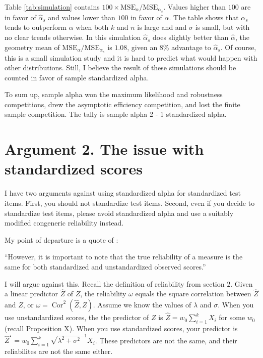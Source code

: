 \documentclass{article}
\theoremstyle{plain}
\theoremstyle{plain}
\theoremstyle{definition}
\theoremstyle{remark}
\theoremstyle{definition}
\theoremstyle{plain}
\theoremstyle{plain}
\theoremstyle{definition}
\DeclareMathOperator{\Cor}{Cor}
\begin{document}
Table \ref{tab:simulation} contains $100 \times \textrm{MSE}_\alpha/\textrm{MSE}_{\alpha_s}$. Values higher than $100$ are in favor of $\widehat{\alpha}_s$ and values lower than $100$ in favor of $\widehat{\alpha}$. The table shows that $\alpha_s$ tends to outperform $\alpha$ when both $k$ and $n$ is large and and $\sigma$ is small, but with no clear trends otherwise. In this simulation $\widehat{\alpha}_s$ does slightly better than $\widehat{\alpha}$, the geometry mean of $\textrm{MSE}_\alpha/\textrm{MSE}_{\alpha_s}$ is $1.08$, given an $8$\% advantage to $\widehat{\alpha}_s$. Of course, this is a small simulation study and it is hard to predict what would happen with other distributions. Still, I believe the result of these simulations should be counted in favor of sample standardized alpha.

To sum up, sample alpha won the maximum likelihood and robustness competitions, drew the asymptotic efficiency competition, and lost the finite sample competition. The tally is sample alpha 2 - 1 standardized alpha. 



\section{Argument 2. The issue with standardized scores}
\label{sec:argument 2}
I have two arguments against using standardized alpha for standardized
test items. First, you should not standardize test items. Second,
even if you decide to standardize test items, please avoid standardized
alpha and use a suitably modified congeneric reliability instead.

My point of departure is a quote of \citet[][p.348]{Osburn2000-jd}:

\enquote{However, it is important to note that the true reliability of a measure is the same for both standardized and unstandardized observed scores.}

I will argue against this. Recall the definition of reliability from
section $2$. Given a linear predictor $\widehat{Z}$ of $Z$, the
reliability $\omega$ equals the square correlation between $\widehat{Z}$
and $Z$, or $\omega=\Cor^{2}(\widehat{Z},Z)$. Assume
we know the values of $\lambda$ and $\sigma$. When you use unstandardized
scores, the the predictor of $Z$ is $\widehat{Z}=w_{0}\sum_{i=1}^{k}X_{i}$
for some $w_{0}$ (recall Proposition X). When you use standardized
scores, your predictor is $\widehat{Z}^{\star}=w_{0}\sum_{i=1}^{k}\sqrt{\lambda^{2}+\sigma^{2}}^{-1}X_{i}$.
These predictors are not the same, and their reliabilites are not
the same either.
\end{document}
